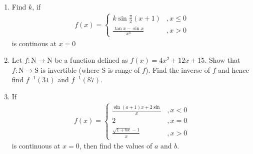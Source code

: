 \begin{enumerate}
	\item Find $k$, if 
	\begin{align*}
		f(x) = \begin{cases} k\sin \frac{\pi}{2}(x+1) &,x \leq 0\\
		\frac{\tan x - \sin x}{x^3} &, x>0
		\end{cases}
	\end{align*}
is continous at $x=0$
	
	\item Let $f: \text{N} \rightarrow \text{N}$ be a function defined as 
	$f(x) = 4x^2 + 12x + 15.$
Show that $f: \text{N} \rightarrow \text{S}$ is invertible (where S is range of $f$).
Find the inverse of $f$ and hence find $f^{-1}(31)$ and $f^{-1}(87)$.


	\item If 
	\begin{align*}
		f(x) = 
		\begin{cases}
			\frac{\sin(a+1)x + 2\sin}{x} &,x<0 \\
			2 &,x = 0\\
			\frac{\sqrt{1+bx}-1}{x} &,x>0
		\end{cases}
	\end{align*}
is continuous at $x = 0$, then find the values of $a$ and $b$.


\end{enumerate}
